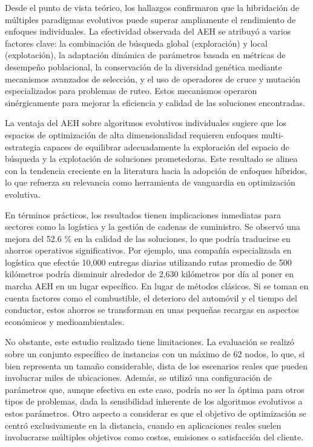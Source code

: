 \documentclass[10pt,a4paper]{article}
\begin{document}
\begin{multicols}{2}
Desde el punto de vista teórico, los hallazgos confirmaron que la hibridación de múltiples paradigmas evolutivos puede superar ampliamente el rendimiento de enfoques individuales. La efectividad observada del AEH se atribuyó a varios factores clave: la combinación de búsqueda global (exploración) y local (explotación), la adaptación dinámica de parámetros basada en métricas de desempeño poblacional, la conservación de la diversidad genética mediante mecanismos avanzados de selección, y el uso de operadores de cruce y mutación especializados para problemas de ruteo. Estos mecanismos operaron sinérgicamente para mejorar la eficiencia y calidad de las soluciones encontradas.

La ventaja del AEH sobre algoritmos evolutivos individuales sugiere que los espacios de optimización de alta dimensionalidad requieren enfoques multi-estrategia capaces de equilibrar adecuadamente la exploración del espacio de búsqueda y la explotación de soluciones prometedoras. Este resultado se alinea con la tendencia creciente en la literatura hacia la adopción de enfoques híbridos, lo que refuerza su relevancia como herramienta de vanguardia en optimización evolutiva.

En términos prácticos, los resultados tienen implicaciones inmediatas para sectores como la logística y la gestión de cadenas de suministro. Se observó una mejora del 52.6 \% en la calidad de las soluciones, lo que podría traducirse en ahorros operativos significativos. Por ejemplo, una compañía especializada en logística que efectúe 10,000 entregas diarias utilizando rutas promedio de 500 kilómetros podría disminuir alrededor de
2,630 kilómetros por día al poner en marcha AEH en un lugar específico.
En lugar de métodos clásicos. Si se toman en cuenta factores como
el combustible, el deterioro del automóvil y el tiempo
del conductor, estos ahorros se transforman en unas pequeñas recargas
en aspectos económicos y medioambientales.

No obstante, este estudio realizado tiene limitaciones. La evaluación se realizó sobre un conjunto específico de instancias con un máximo de 62 nodos, lo que, si bien representa un tamaño considerable, dista de los escenarios reales que pueden involucrar miles de ubicaciones. Además, se utilizó una configuración de parámetros que, aunque efectiva en este caso, podría no ser la óptima para otros tipos de problemas, dada la sensibilidad inherente de los algoritmos evolutivos a estos parámetros. Otro aspecto a considerar es que el objetivo de optimización se centró exclusivamente en la distancia, cuando en aplicaciones reales suelen involucrarse múltiples objetivos como costos, emisiones o satisfacción del cliente.


\end{multicols}
\end{document}
